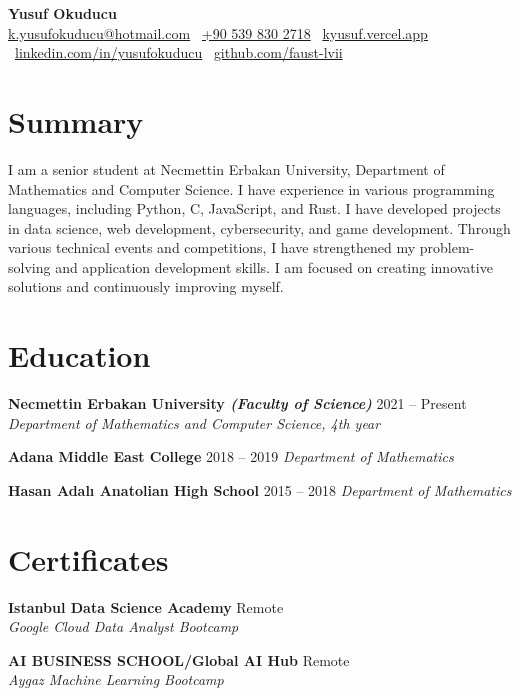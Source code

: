 \documentclass[10pt,a4paper]{extarticle}
\begin{document}
\begin{center}
    \begin{minipage}{\textwidth}
        \centering
        {\LARGE\textbf{Yusuf Okuducu}}\\[10pt]
        \href{mailto:k.yusufokuducu@hotmail.com}{k.yusufokuducu@hotmail.com} \textbullet\
        \href{tel:+905398302718}{+90 539 830 2718} \textbullet\
        \href{https://kyusuf.vercel.app}{kyusuf.vercel.app} \textbullet\
        \href{https://linkedin.com/in/yusufokuducu}{linkedin.com/in/yusufokuducu} \textbullet\
        \href{https://github.com/faust-lvii}{github.com/faust-lvii}
    \end{minipage}
\end{center}
\section{Summary}
I am a senior student at Necmettin Erbakan University, Department of Mathematics
and Computer Science. I have experience in various programming languages,
including Python, C, JavaScript, and Rust. I have developed projects in data science,
web development, cybersecurity, and game development. Through various technical
events and competitions, I have strengthened my problem-solving and application
development skills. I am focused on creating innovative solutions and continuously
improving myself.
\section{Education}
\textbf{Necmettin Erbakan University \textit{(Faculty of Science)}} \hfill 2021 -- Present\\
\textit{Department of Mathematics and Computer Science, 4th year}

\textbf{Adana Middle East College} \hfill 2018 -- 2019
\textit{Department of Mathematics}

\textbf{Hasan Adalı Anatolian High School} \hfill 2015 -- 2018
\textit{Department of Mathematics}

\section{Certificates}
\textbf{Istanbul Data Science Academy} \hfill Remote\\
\textit{Google Cloud Data Analyst Bootcamp}

\textbf{AI BUSINESS SCHOOL/Global AI Hub} \hfill Remote\\
\textit{Aygaz Machine Learning Bootcamp}
\end{document}
